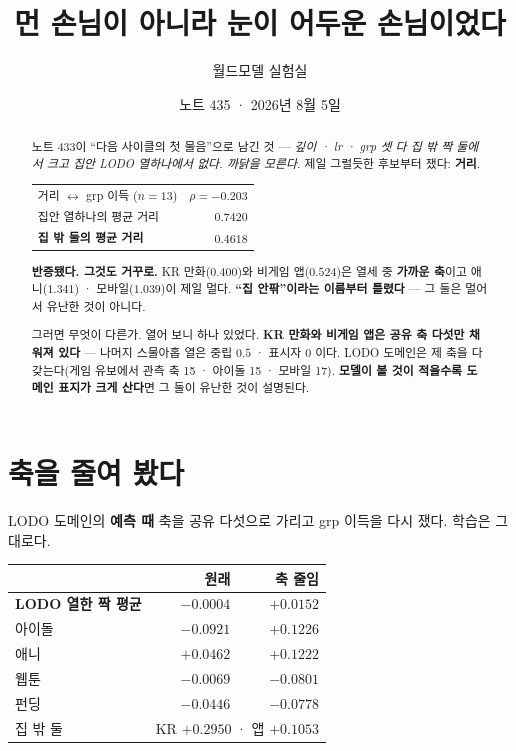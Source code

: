 \documentclass[11pt]{article}
\begin{document}
\title{먼 손님이 아니라 눈이 어두운 손님이었다}
\author{월드모델 실험실}
\date{노트 435 · 2026년 8월 5일}
\maketitle

\begin{abstract}
노트 433이 ``다음 사이클의 첫 물음''으로 남긴 것 --- \emph{깊이 · lr · grp
셋 다 집 밖 짝 둘에서 크고 집안 LODO 열하나에서 없다. 까닭을 모른다.}
제일 그럴듯한 후보부터 쟀다: \textbf{거리}.

\begin{center}
\begin{tabular}{lr}
\hline
거리 $\leftrightarrow$ grp 이득 ($n{=}13$) & $\rho = \mathbf{-0.203}$ \\
집안 열하나의 평균 거리 & $0.7420$ \\
\textbf{집 밖 둘의 평균 거리} & $\mathbf{0.4618}$ \\
\hline
\end{tabular}
\end{center}

\textbf{반증됐다. 그것도 거꾸로.} KR 만화($0.400$)와 비게임 앱($0.524$)은
열세 중 \textbf{가까운 축}이고 애니($1.341$) · 모바일($1.039$)이 제일 멀다.
\textbf{``집 안팎''이라는 이름부터 틀렸다} --- 그 둘은 멀어서 유난한 것이
아니다.

그러면 무엇이 다른가. 열어 보니 하나 있었다. \textbf{KR 만화와 비게임 앱은
공유 축 다섯만 채워져 있다} --- 나머지 스물아홉 열은 중립 $0.5$ · 표시자 $0$
이다. LODO 도메인은 제 축을 다 갖는다(게임 유보에서 관측 축 15 · 아이돌 15 ·
모바일 17). \textbf{모델이 볼 것이 적을수록 도메인 표지가 크게 산다}면 그
둘이 유난한 것이 설명된다.
\end{abstract}

\section{축을 줄여 봤다}

LODO 도메인의 \textbf{예측 때} 축을 공유 다섯으로 가리고 grp 이득을 다시 쟀다.
학습은 그대로다.

\begin{center}
\begin{tabular}{lrr}
\hline
 & 원래 & 축 줄임 \\
\hline
\textbf{LODO 열한 짝 평균} & $-0.0004$ & $\mathbf{+0.0152}$ \\
아이돌 & $-0.0921$ & $\mathbf{+0.1226}$ \\
애니 & $+0.0462$ & $\mathbf{+0.1222}$ \\
웹툰 & $-0.0069$ & $-0.0801$ \\
펀딩 & $-0.0446$ & $-0.0778$ \\
\hline
집 밖 둘 & \multicolumn{2}{c}{KR $+0.2950$ · 앱 $+0.1053$} \\
\hline
\end{tabular}
\end{center}
\end{document}
